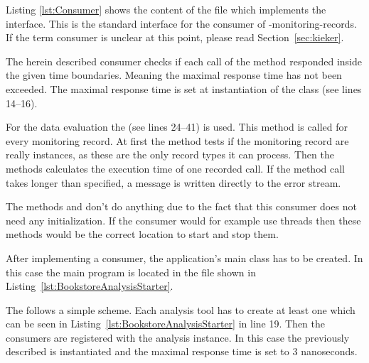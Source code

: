 Listing \ref{lst:Consumer} shows the content of the  file which implements the  interface. This is the standard interface for the consumer of \Kieker{}-monitoring-records. If the term consumer is unclear at this point, please read Section~\ref{sec:kieker}.

\setJavaCodeListing       



\noindent The herein described consumer checks if each call of the  method responded inside the given time boundaries. Meaning the maximal response time has not been exceeded. The maximal response time is set at instantiation of the  class (see lines 14--16). 

For the data evaluation the  (see lines 24--41) is used. This method is called for every monitoring record. At first the method tests if the monitoring record are really  instances, as these are the only record types it can process. Then the methods calculates the execution time of one recorded  call. If the method call takes longer than specified, a message is written directly to the error stream.

The methods  and  don't do anything due to the fact that this consumer does not need any initialization. If the consumer would for example use threads then these methods would be the correct location to start and stop them.

After implementing a consumer, the application's main class has to be created. In this case the main program is located in the  file shown in Listing~\ref{lst:BookstoreAnalysisStarter}.

\setJavaCodeListing       


\noindent The  follows a simple scheme. Each analysis tool has to create at least one  which can be seen in Listing~\ref{lst:BookstoreAnalysisStarter} in line 19. Then the consumers are registered with the analysis instance. In this case the previously described  is instantiated and the maximal response time is set to 3 nanoseconds. 

